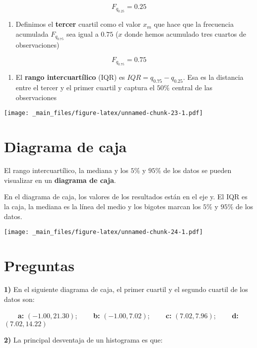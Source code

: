 \documentclass[
]{book}
\providecommand{\tightlist}{%
  \setlength{\itemsep}{0pt}\setlength{\parskip}{0pt}}
\begin{document}
\[F_{q_{0.25}}=0.25\]

\begin{enumerate}
\def\labelenumi{\arabic{enumi})}
\tightlist
\item
  Definimos el \textbf{tercer} cuartil como el valor \(x_m\) que hace que la frecuencia acumulada \(F_{q_{0.75}}\) sea igual a \(0.75\) (\(x\) donde hemos acumulado tres cuartos de observaciones)
\end{enumerate}

\[F_{q_{0.75}}=0.75\]

\begin{enumerate}
\def\labelenumi{\arabic{enumi})}
\setcounter{enumi}{2}
\tightlist
\item
  El \textbf{rango intercuartílico} (IQR) es \(IQR=q_{0.75} - q_{0.25}\). Esa es la distancia entre el tercer y el primer cuartil y captura el \(50\%\) central de las observaciones
\end{enumerate}

\texttt{[image: \_main\_files/figure-latex/unnamed-chunk-23-1.pdf]}

\hypertarget{diagrama-de-caja}{%
\section{Diagrama de caja}\label{diagrama-de-caja}}

El rango intercuartílico, la mediana y los \(5\%\) y \(95\%\) de los datos se pueden visualizar en un \textbf{diagrama de caja}.

En el diagrama de caja, los valores de los resultados están en el eje y. El IQR es la caja, la mediana es la línea del medio y los bigotes marcan los \(5\%\) y \(95\%\) de los datos.

\texttt{[image: \_main\_files/figure-latex/unnamed-chunk-24-1.pdf]}

\hypertarget{preguntas}{%
\section{Preguntas}\label{preguntas}}

\textbf{1)} En el siguiente diagrama de caja, el primer cuartil y el segundo cuartil de los datos son:

\textbf{\(\qquad\)a:} \((-1.00, 21.30)\); \textbf{\(\qquad\)b:} \((-1.00, 7.02)\); \textbf{\(\qquad\)c:} \((7.02, 7.96)\); \textbf{\(\qquad\)d:} \((7.02, 14.22)\)

\textbf{2)} La principal desventaja de un histograma es que:
\end{document}
